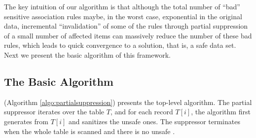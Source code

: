 The key intuition of our algorithm is that although the total number of
``bad'' sensitive association rules
maybe, in the worst case, exponential in the original data, incremental
``invalidation'' of some of the rules through partial suppression of a
small number of affected items can massively reduce the number of these bad
rules, which leads to quick convergence to a solution, that is, a
safe data set.
%
Next we present the basic algorithm of this framework.

\subsection{The Basic Algorithm}
\label{sec:basic}

\PartialSuppression (Algorithm \ref{algo:partialsuppression}) presents the
top-level algorithm. The partial suppressor iterates over the table $T$, and
for each record $T[i]$, the algorithm first generates  \qids from $T[i]$ and
sanitizes the unsafe ones. The suppressor terminates when the whole table is
scanned and there is no unsafe \qid.

